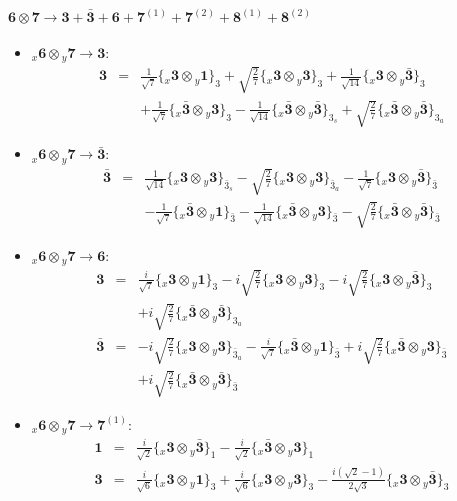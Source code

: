 \documentclass[english]{article}
\newcommand{\rep}[1]{\mathbf{#1}}
\newcommand{\repx}[2]{{}_{#2}\mathbf{#1}}
\newcommand{\subcg}[3]{\big\{ \repx{#1}{x}\otimes\repx{#2}{y}\big\}^{}_{#3}}
\begin{document}
\paragraph*{\Large $\rep{6}\otimes\rep{7}\to\rep{3}+\rep{\bar{3}}+\rep{6}+\rep{7}^{(1)}+\rep{7}^{(2)}+\rep{8}^{(1)}+\rep{8}^{(2)}$}
\begin{itemize}
\item $\repx{6}{x}\otimes\repx{7}{y}\to\rep{3}$:
\begin{eqnarray*}
\rep{3} &=& \frac{1}{\sqrt{7}}\subcg{3}{1}{3}+\sqrt{\frac{2}{7}}\subcg{3}{3}{3}+\frac{1}{\sqrt{14}}\subcg{3}{\bar{3}}{3} \\ 
 & & +\frac{1}{\sqrt{7}}\subcg{\bar{3}}{3}{3}-\frac{1}{\sqrt{14}}\subcg{\bar{3}}{\bar{3}}{3_{s}}+\sqrt{\frac{2}{7}}\subcg{\bar{3}}{\bar{3}}{3_{a}}
\end{eqnarray*}
\item $\repx{6}{x}\otimes\repx{7}{y}\to\rep{\bar{3}}$:
\begin{eqnarray*}
\rep{\bar{3}} &=& \frac{1}{\sqrt{14}}\subcg{3}{3}{\bar{3}_{s}}-\sqrt{\frac{2}{7}}\subcg{3}{3}{\bar{3}_{a}}-\frac{1}{\sqrt{7}}\subcg{3}{\bar{3}}{\bar{3}} \\ 
 & & -\frac{1}{\sqrt{7}}\subcg{\bar{3}}{1}{\bar{3}}-\frac{1}{\sqrt{14}}\subcg{\bar{3}}{3}{\bar{3}}-\sqrt{\frac{2}{7}}\subcg{\bar{3}}{\bar{3}}{\bar{3}}
\end{eqnarray*}
\item $\repx{6}{x}\otimes\repx{7}{y}\to\rep{6}$:
\begin{eqnarray*}
\rep{3} &=& \frac{i}{\sqrt{7}}\subcg{3}{1}{3}-i \sqrt{\frac{2}{7}}\subcg{3}{3}{3}-i \sqrt{\frac{2}{7}}\subcg{3}{\bar{3}}{3} \\ 
 & & +i \sqrt{\frac{2}{7}}\subcg{\bar{3}}{\bar{3}}{3_{a}}
\\
\rep{\bar{3}} &=& -i \sqrt{\frac{2}{7}}\subcg{3}{3}{\bar{3}_{a}}-\frac{i}{\sqrt{7}}\subcg{\bar{3}}{1}{\bar{3}}+i \sqrt{\frac{2}{7}}\subcg{\bar{3}}{3}{\bar{3}} \\ 
 & & +i \sqrt{\frac{2}{7}}\subcg{\bar{3}}{\bar{3}}{\bar{3}}
\end{eqnarray*}
\item $\repx{6}{x}\otimes\repx{7}{y}\to\rep{7}^{(1)}$:
\begin{eqnarray*}
\rep{1} &=& \frac{i}{\sqrt{2}}\subcg{3}{\bar{3}}{1}-\frac{i}{\sqrt{2}}\subcg{\bar{3}}{3}{1}
\\
\rep{3} &=& \frac{i}{\sqrt{6}}\subcg{3}{1}{3}+\frac{i}{\sqrt{6}}\subcg{3}{3}{3}-\frac{i \left(\sqrt{2}-1\right)}{2 \sqrt{3}}\subcg{3}{\bar{3}}{3} \\ 

\end{eqnarray*}
\end{itemize}
\end{document}
